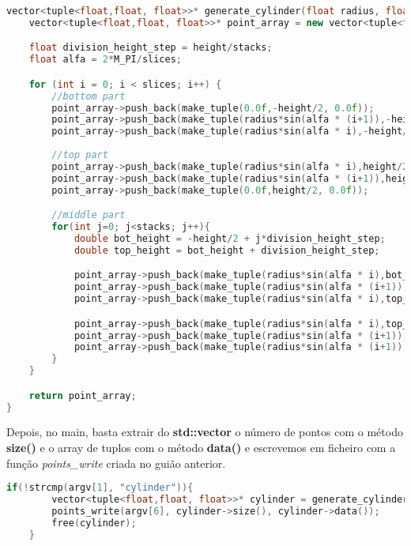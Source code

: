 \documentclass[14pt, a4 paper]{report}
\begin{document}
\begin{lstlisting}[language = c++]
vector<tuple<float,float, float>>* generate_cylinder(float radius, float height, int slices, int stacks){
    vector<tuple<float,float, float>>* point_array = new vector<tuple<float,float,float>>;

    float division_height_step = height/stacks;
    float alfa = 2*M_PI/slices;

    for (int i = 0; i < slices; i++) {
        //bottom part
        point_array->push_back(make_tuple(0.0f,-height/2, 0.0f));
        point_array->push_back(make_tuple(radius*sin(alfa * (i+1)),-height/2, radius*cos(alfa * (i+1))));
        point_array->push_back(make_tuple(radius*sin(alfa * i),-height/2, radius*cos(alfa * i)));
        
        //top part
        point_array->push_back(make_tuple(radius*sin(alfa * i),height/2, radius*cos(alfa * i)));
        point_array->push_back(make_tuple(radius*sin(alfa * (i+1)),height/2, radius*cos(alfa * (i+1))));
        point_array->push_back(make_tuple(0.0f,height/2, 0.0f));

        //middle part
        for(int j=0; j<stacks; j++){
            double bot_height = -height/2 + j*division_height_step;
            double top_height = bot_height + division_height_step;

            point_array->push_back(make_tuple(radius*sin(alfa * i),bot_height, radius*cos(alfa * i)));
            point_array->push_back(make_tuple(radius*sin(alfa * (i+1)),bot_height, radius*cos(alfa * (i+1))));
            point_array->push_back(make_tuple(radius*sin(alfa * i),top_height, radius*cos(alfa * i)));

            point_array->push_back(make_tuple(radius*sin(alfa * i),top_height, radius*cos(alfa * i)));
            point_array->push_back(make_tuple(radius*sin(alfa * (i+1)),bot_height, radius*cos(alfa * (i+1))));
            point_array->push_back(make_tuple(radius*sin(alfa * (i+1)),top_height, radius*cos(alfa * (i+1))));
        }
	}

    return point_array;
}
\end{lstlisting}

Depois, no main, basta extrair do \textbf{std::vector} o número de pontos com o método \textbf{size()} e o array de tuplos com o método \textbf{data()} e escrevemos em ficheiro com a função \textit{points\_write} criada no guião anterior.

\begin{lstlisting}[language = c++]
if(!strcmp(argv[1], "cylinder")){
        vector<tuple<float,float, float>>* cylinder = generate_cylinder(atof(argv[2]), atof(argv[3]), atoi(argv[4]), atoi(argv[5]));
        points_write(argv[6], cylinder->size(), cylinder->data());
        free(cylinder);
    }
\end{lstlisting}
\end{document}
